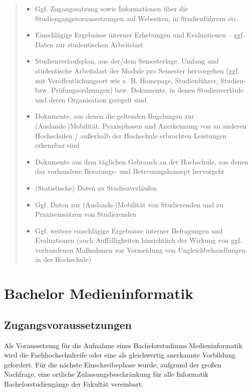 \begin{quote}
\begin{itemize}
\item
  Ggf. Zugangssatzung sowie Informationen über die
  Studiengangsvoraussetzungen auf Webseiten, in Studienführern etc.
\item
  Einschlägige Ergebnisse interner Erhebungen und Evaluationen -- ggf.
  Daten zur studentischen Arbeitslast
\item
  Studienverlaufsplan, aus der/dem Semesterlage, Umfang und studentische
  Arbeitslast der Module pro Semester hervorgehen (ggf. mit
  Veröffentlichungsort wie z.~B. Homepage, Studienführer, Studien- bzw.
  Prüfungsordnungen) bzw. Dokumente, in denen Studienverläufe und deren
  Organisation geregelt sind
\item
  Dokumente, aus denen die geltenden Regelungen zur
  (Auslands-)Mobilität, Praxisphasen und Anerkennung von an anderen
  Hochschulen / außerhalb der Hochschule erbrachten Leistungen erkennbar
  sind
\item
  Dokumente aus dem täglichen Gebrauch an der Hochschule, aus denen das
  vorhandene Beratungs- und Betreuungskonzept hervorgeht
\item
  (Statistische) Daten zu Studienverläufen
\item
  Ggf. Daten zur (Auslands-)Mobilität von Studierenden und zu
  Praxiseinsätzen von Studierenden
\item
  Ggf. weitere einschlägige Ergebnisse interner Befragungen und
  Evaluationen (auch Auffälligkeiten hinsichtlich der Wirkung von ggf.
  vorhandenen Maßnahmen zur Vermeidung von Ungleichbehandlungen in der
  Hochschule)
\end{itemize}
\end{quote}

\section{Bachelor
Medieninformatik}\label{bachelor-medieninformatik-1}

\subsection{Zugangsvoraussetzungen}\label{zugangsvoraussetzungen}

Als Voraussetzung für die Aufnahme eines Bachelorstudiums
Medieninformatik wird die Fachhochschulreife oder eine als gleichwertig
anerkannte Vorbildung gefordert. Für die nächste Einschreibephase wurde,
aufgrund der großen Nachfrage, eine ortliche Zulassungsbeschränkung für
alle Informatik Bachelorstudiengänge der Fakultät vereinbart.

